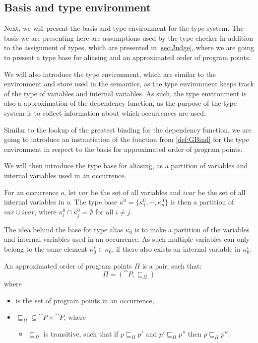 \documentclass[../../master.tex]{subfiles}
\begin{document}
\subsection{Basis and type environment}\label{sec:basis}
Next, we will present the basis and type environment for the type system.
The basis we are presenting here are assumptions used by the type checker in addition to the assignment of types, which are presented in \cref{sec:Judge}, where we are going to present a type base for aliasing and an approximated order of program points.

We will also introduce the type environment, which are similar to the environment and store used in the semantics, as the type environment keeps track of the type of variables and internal variables.
As such, the type environment is also a approximation of the dependency function, as the purpose of the type system is to collect information about which occurrences are used.

Similar to the lookup of the greatest binding for the dependency function, we are going to introduce an instantiation of the function from \cref{def:GBind} for the type environment in respect to the basis for approximated order of program points.
\bigskip

We will then introduce the type base for aliasing, as a partition of variables and internal variables used in an occurrence.

\begin{definition}
	For an occurrence $o$, let $var$ be the set of all variables and $ivar$ be the set of all internal variables in $o$.
	The type base $\kappa^0=\{\kappa^0_1,\cdots,\kappa^0_n\}$ is then a partition of $var\cup ivar$, where $\kappa_i^0\cap\kappa_j^0=\emptyset$ for all $i\neq j$.
\end{definition}

The idea behind the base for type alias $\kappa_0$ is to make a partition of the variables and internal variables used in an occurrence.
As such multiple variables can only belong to the same element $\kappa_0^i\in\kappa_0$, if there also exists an internal variable in $\kappa_0^i$.

\begin{definition}
	An approximated order of program points $\Pi$ is a pair, such that: 
	$$\Pi=(\cat{P},\sqsubseteq_\Pi)$$
	where
	\begin{itemize}
		\item {} is the set of program points in an occurrence,
		\item $\sqsubseteq_\Pi\subseteq\cat{P}\times\cat{P}$, where
		\begin{itemize}
			\item $\sqsubseteq_\Pi$ is transitive, such that if $p\sqsubseteq_\Pi p'$ and $p'\sqsubseteq_\Pi p''$ then $p\sqsubseteq_\Pi p''$.
		\end{itemize}
	\end{itemize}
\end{definition}
\end{document}
